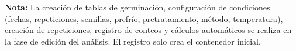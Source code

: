 \vspace{0.5em}
\noindent\textbf{Nota:} La creación de tablas de germinación, configuración de condiciones (fechas, repeticiones, semillas, prefrío, pretratamiento, método, temperatura), creación de repeticiones, registro de conteos y cálculos automáticos se realiza en la fase de edición del análisis. El registro solo crea el contenedor inicial.
